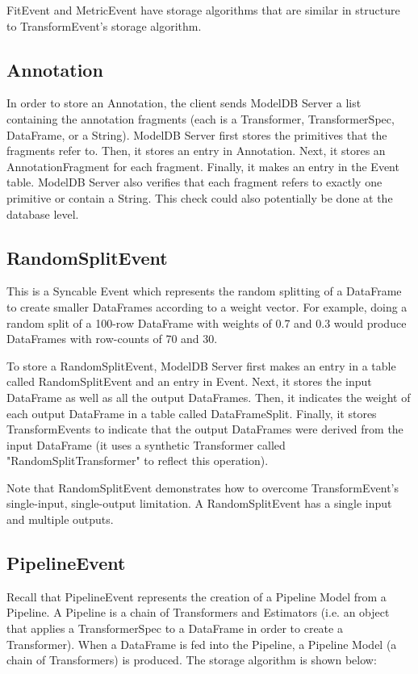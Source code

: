 FitEvent and MetricEvent have storage algorithms that are similar in structure to TransformEvent's
storage algorithm.

\subsection{Annotation}
In order to store an Annotation, the client sends ModelDB Server a list containing 
the annotation fragments (each is a Transformer, TransformerSpec, DataFrame, or a String).
ModelDB Server first stores the primitives that the fragments refer to. Then, it stores
an entry in Annotation. Next, it stores an AnnotationFragment for each fragment. Finally,
it makes an entry in the Event table. ModelDB Server also verifies that each fragment refers
to exactly one primitive or contain a String. This check could also potentially be done at the database level.

\subsection{RandomSplitEvent}
This is a Syncable Event which represents the random splitting of a DataFrame
to create smaller DataFrames according to a weight vector. For example, doing
a random split of a 100-row DataFrame with weights of 0.7 and 0.3 would produce
DataFrames with row-counts of 70 and 30.

To store a RandomSplitEvent, ModelDB Server first makes an entry in a table
called RandomSplitEvent and an entry in Event. Next, it stores the input DataFrame
as well as all the output DataFrames. Then, it indicates the weight of each output
DataFrame in a table called DataFrameSplit. Finally, it stores TransformEvents to
indicate that the output DataFrames were derived from the input DataFrame (it uses
a synthetic Transformer called "RandomSplitTransformer" to reflect this operation).

Note that RandomSplitEvent demonstrates how to overcome TransformEvent's single-input,
single-output limitation. A RandomSplitEvent has a single input and multiple outputs.

\subsection{PipelineEvent}
Recall that PipelineEvent represents the creation of a Pipeline Model from a Pipeline.
A Pipeline is a chain of Transformers and Estimators (i.e. an object that applies a TransformerSpec
to a DataFrame in order to create a Transformer). When a DataFrame is fed into the Pipeline, a Pipeline Model (a
chain of Transformers) is produced.  The storage algorithm is shown below:

